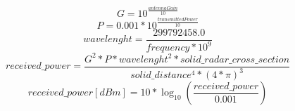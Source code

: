 \documentclass{article}
\begin{document}
$$ G = 10^{\frac{antennaGain}{10}} $$
$$ P = 0.001 * 10^{\frac{transmittedPower}{10}} $$
$$ wavelenght = \frac{299792458.0}{frequency * 10^{9}} $$
$$ received\_power = \frac{G^{2} * P * wavelenght^{2} * solid\_radar\_cross\_section}{solid\_distance^{4} * (4 * \pi)^{3} } $$
$$ received\_power [dBm] = 10 * \log_{10}(\frac{received\_power}{0.001}) $$
\end{document}
